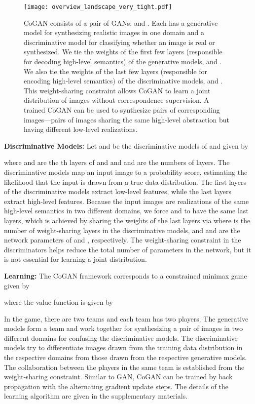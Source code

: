 \documentclass{article}
\begin{document}
\begin{figure}[t!]
\centering
\texttt{[image: overview\_landscape\_very\_tight.pdf]}
\caption{\small CoGAN consists of a pair of GANs:  and . Each has a generative model for synthesizing realistic images in one domain and a discriminative model for classifying whether an image is real or synthesized. We tie the weights of the first few layers (responsible for decoding high-level semantics) of the generative models,  and . We also tie the weights of the last few layers (responsible for encoding high-level semantics) of the discriminative models,  and . This weight-sharing constraint allows CoGAN to learn a joint distribution of images without correspondence supervision. A trained CoGAN can be used to synthesize pairs of corresponding images---pairs of images sharing the same high-level abstraction but having different low-level realizations.}
\label{fig::DGAN}
\end{figure}

{\bf Discriminative Models: }
Let  and  be the discriminative models of  and  given by

where  and  are the th layers of  and  and  and  are the numbers of layers. The discriminative models map an input image to a probability score, estimating the likelihood that the input is drawn from a true data distribution. The first layers of the discriminative models extract low-level features, while the last layers extract high-level features. Because the input images are realizations of the same high-level semantics in two different domains, we force  and  to have the same last layers, which is achieved by sharing the weights of the last layers via
\theta\theta
where  is the number of weight-sharing layers in the discriminative models, and \theta and \theta are the network parameters of  and , respectively. The weight-sharing constraint in the discriminators helps reduce the total number of parameters in the network, but it is not essential for learning a joint distribution.

{\bf Learning: }
The CoGAN framework corresponds to a constrained minimax game given by

where the value function  is given by 

In the game, there are two teams and each team has two players. The generative models form a team and work together for synthesizing a pair of images in two different domains for confusing the discriminative models. The discriminative models try to differentiate images drawn from the training data distribution in the respective domains from those drawn from the respective generative models. The collaboration between the players in the same team is established from the weight-sharing constraint. Similar to GAN, CoGAN can be trained by back propagation with the alternating gradient update steps. The details of the learning algorithm are given in the supplementary materials.
\end{document}
